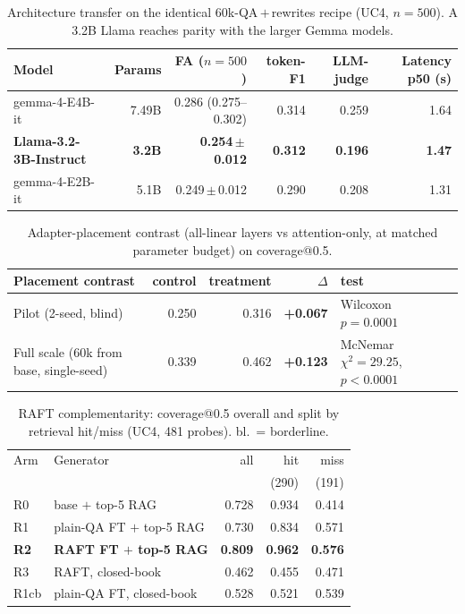 \begin{table}[!t]
\centering
\caption{Architecture transfer on the identical 60k-QA\,$+$\,rewrites recipe (UC4, $n{=}500$). A 3.2B Llama reaches parity with the larger Gemma models.}
\label{tab:transfer}
\small
\begin{tabular}{@{}l r r r r r@{}}
\toprule
Model & Params & FA ($n{=}500$) & token-F1 & LLM-judge & Latency p50 (s) \\
\midrule
gemma-4-E4B-it & 7.49B & 0.286 (0.275--0.302) & 0.314 & 0.259 & 1.64 \\
\textbf{Llama-3.2-3B-Instruct} & \textbf{3.2B} & \textbf{0.254\,$\pm$\,0.012} & \textbf{0.312} & \textbf{0.196} & \textbf{1.47} \\
gemma-4-E2B-it & 5.1B & 0.249\,$\pm$\,0.012 & 0.290 & 0.208 & 1.31 \\
\bottomrule
\end{tabular}
\end{table}

\begin{table}[!t]
\centering
\caption{Adapter-placement contrast (all-linear layers vs attention-only, at matched parameter budget) on coverage@0.5.}
\label{tab:placement}
\small
\begin{tabular}{@{}l r r r l@{}}
\toprule
Placement contrast & control & treatment & $\Delta$ & test \\
\midrule
Pilot (2-seed, blind) & 0.250 & 0.316 & \textbf{+0.067} & Wilcoxon $p{=}0.0001$ \\
Full scale (60k from base, single-seed) & 0.339 & 0.462 & \textbf{+0.123} & McNemar $\chi^2{=}29.25$, $p{<}0.0001$ \\
\bottomrule
\end{tabular}
\end{table}

\begin{table}[!htbp]
\centering
\caption{RAFT complementarity: coverage@0.5 overall and split by retrieval hit/miss (UC4, 481 probes). bl.\ = borderline.}
\label{tab:raft}
\small
\begin{tabularx}{\columnwidth}{@{}l L r r r@{}}
\toprule
Arm & Generator & all & hit & miss \\
    &           &     & \scriptsize(290) & \scriptsize(191) \\
\midrule
R0 & base $+$ top-5 RAG & 0.728 & 0.934 & 0.414 \\
R1 & plain-QA FT $+$ top-5 RAG & 0.730 & 0.834 & 0.571 \\
\textbf{R2} & \textbf{RAFT FT $+$ top-5 RAG} & \textbf{0.809} & \textbf{0.962} & \textbf{0.576} \\
R3 & RAFT, closed-book & 0.462 & 0.455 & 0.471 \\
R1cb & plain-QA FT, closed-book & 0.528 & 0.521 & 0.539 \\
\bottomrule
\end{tabularx}
\end{table}

